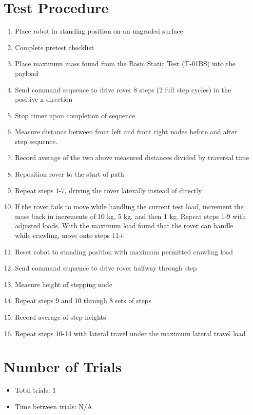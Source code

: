\documentclass[11pt]{article}
\begin{document}
\section*{Test Procedure}
\begin{enumerate}[noitemsep]
    \item Place robot in standing position on an ungraded surface
    \item Complete pretest checklist
    \item Place maximum mass found from the Basic Static Test (T-01BS) into the payload
    \item Send command sequence to drive rover 8 steps (2 full step cycles) in the positive x-direction
    \item Stop timer upon completion of sequence
    \item Measure distance between front left and front right nodes before and after step sequence.
    \item Record average of the two above measured distances divided by traversal time
    \item Reposition rover to the start of path
    \item Repeat steps 1-7, driving the rover laterally instead of directly
    \item If the rover fails to move while handling the current test load, increment the mass back in increments of 10 kg, 5 kg, and then 1 kg. Repeat steps 1-9 with adjusted loads. With the maximum load found that the rover can handle while crawling, move onto steps 11+.
    \item Reset robot to standing position with maximum permitted crawling load
    \item Send command sequence to drive rover halfway through step
    \item Measure height of stepping node
    \item Repeat steps 9 and 10 through 8 sets of steps
    \item Record average of step heights
    \item Repeat steps 10-14 with lateral travel under the maximum lateral travel load

\end{enumerate}

\section*{Number of Trials}
\begin{itemize}[noitemsep]
    \item Total trials: 1
    \item Time between trials: N/A
\end{itemize}
\end{document}

